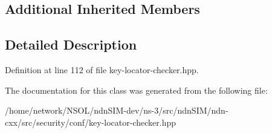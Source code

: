 \subsection*{Additional Inherited Members}


\subsection{Detailed Description}


Definition at line 112 of file key-\/locator-\/checker.\+hpp.



The documentation for this class was generated from the following file\+:\begin{DoxyCompactItemize}
\item 
/home/network/\+N\+S\+O\+L/ndn\+S\+I\+M-\/dev/ns-\/3/src/ndn\+S\+I\+M/ndn-\/cxx/src/security/conf/key-\/locator-\/checker.\+hpp\end{DoxyCompactItemize}
